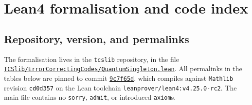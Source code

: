 \documentclass[11pt]{article}
\theoremstyle{plain}
\theoremstyle{definition}
\begin{document}






\appendix
\section{Lean4 formalisation and code index}\label{app:lean}


\subsection{Repository, version, and permalinks}
The formalisation lives in the \texttt{tcslib} repository, in the file
\href{https://github.com/Shilun-Allan-Li/tcslib/blob/9c7f65d5b18b64bc56760a2a09dfe6fe3305b8d6/TCSlib/ErrorCorrectingCodes/QuantumSingleton.lean}{\texttt{TCSlib/ErrorCorrectingCodes/QuantumSingleton.lean}}.
All permalinks in the tables below are pinned to commit
\href{https://github.com/Shilun-Allan-Li/tcslib/tree/9c7f65d5b18b64bc56760a2a09dfe6fe3305b8d6}{\texttt{9c7f65d}},
which compiles against \texttt{Mathlib} revision \texttt{cd0d357} on the Lean toolchain
\texttt{leanprover/lean4:v4.25.0-rc2}.  The main file contains no \texttt{sorry}, \texttt{admit},
or introduced \texttt{axiom}s.
\end{document}
